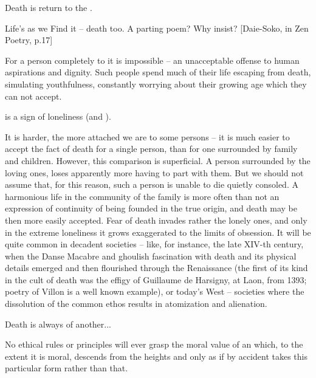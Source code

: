 
Death is return to the .

Life's as we \lin Find it -- death too. \lin A parting poem? \lin Why insist?
[Daie-Soko, in Zen Poetry, p.17]


For a person completely  to  it is impossible
-- an unacceptable offense to human aspirations and dignity. Such people spend
much of their life escaping from death, simulating youthfulness, constantly
worrying about their growing age which they can not accept.

 is a sign of loneliness (and ). 

It is harder, the more attached we are to some persons -- it is much easier to
accept the fact of death for a single person, than for one surrounded by family
and children. However, this comparison is superficial. A person
surrounded by the loving ones, loses apparently more having to part with
them. But we should not assume that, for this reason, such a person is unable to
die quietly consoled. A harmonious life in the community of the family is more
often than not an expression of continuity of being founded in the true origin,
and death may be then more easily accepted. Fear of death invades rather the
lonely ones, and only in the extreme loneliness
it grows exaggerated to the limits of obsession.
It will be quite common in decadent societies -- like, for instance, the late
XIV-th century, when the Danse Macabre and ghoulish fascination
with death and its physical details
emerged and then flourished through the Renaissance (the first of its kind in the
cult of death was the effigy of Guillaume 
de Harsigny, at Laon, from 1393; poetry of Villon is a well known
example),
or today's West -- societies where the dissolution of the common ethos results
in atomization and alienation.

Death is always of another...




No ethical rules or principles will ever grasp the moral value of an
 which, to the extent it is moral, descends from the 
heights and only as if by accident takes this particular form rather than that.


